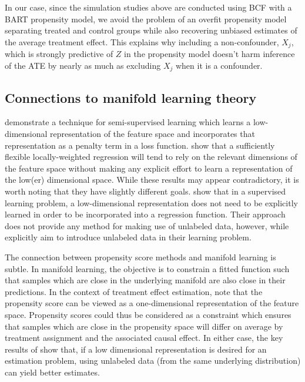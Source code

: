 \documentclass[aos]{imsart}
\begin{document}
In our case, since the simulation studies above are conducted using BCF with a BART propensity model, we avoid the problem of an overfit propensity model separating treated and control groups while also recovering unbiased estimates of the average treatment effect. 
This explains why including a non-confounder, $X_j$, which is strongly predictive of $Z$ in the propensity model doesn't harm inference of the ATE by nearly as much as excluding $X_j$ when it is a 
confounder. 

\subsection{Connections to manifold learning theory}

\cite{belkin2006manifold} demonstrate a technique for semi-supervised learning which learns a low-dimensional representation of the feature space and incorporates that representation 
as a penalty term in a loss function. \cite{bickel2007local} show that a sufficiently flexible locally-weighted regression will tend to rely on the relevant dimensions of the feature space 
without making any explicit effort to learn a representation of the low(er) dimensional space. While these results may appear contradictory, it is worth noting that they have slightly different goals. 
\cite{bickel2007local} show that in a supervised learning problem, a low-dimensional representation does not need to be explicitly learned in order to be incorporated into a regression function. 
Their approach does not provide any method for making use of unlabeled data, however, while \cite{belkin2006manifold} explicitly aim to introduce unlabeled data in their learning problem.

The connection between propensity score methods and manifold learning is subtle. In manifold learning, the objective is to constrain a fitted function such that samples which are close 
in the underlying manifold are also close in their predictions. In the context of treatment effect estimation, \cite{hahn2020bayesian} note that the propensity score can be viewed 
as a one-dimensional representation of the feature space. Propensity scores could thus be considered as a constraint which ensures that samples which are close in the propensity space 
will differ on average by treatment assignment and the associated causal effect. In either case, the key results of \cite{belkin2006manifold} show that, if a low dimensional representation is 
desired for an estimation problem, using unlabeled data (from the same underlying distribution) can yield better estimates.
\end{document}
